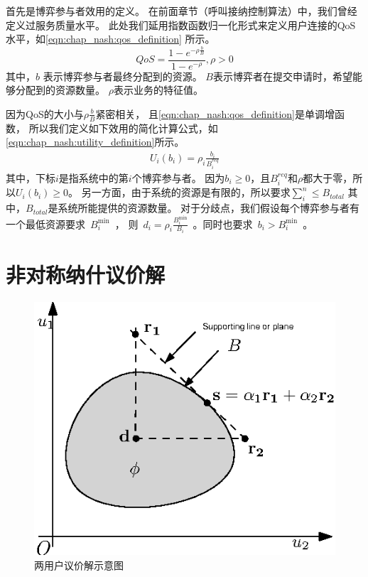 首先是博弈参与者效用的定义。
在前面章节（呼叫接纳控制算法）中，我们曾经定义过服务质量水平。
此处我们延用指数函数归一化形式来定义用户连接的QoS水平，如\eqref{eqn:chap_nash:qos_definition} 所示。
\begin{equation}
QoS = \frac{1- e^{-\rho \frac{b}{B} }}{1-e^{-\rho}}, \rho > 0
\label{eqn:chap_nash:qos_definition}
\end{equation}
其中，$b$ 表示博弈参与者最终分配到的资源。
$B$表示博弈者在提交申请时，希望能够分配到的资源数量。
$\rho$表示业务的特征值。

因为QoS的大小与$\rho \frac{b}{B}$紧密相关，
且\eqref{eqn:chap_nash:qos_definition}是单调增函数，
所以我们定义如下效用的简化计算公式，如 \eqref{eqn:chap_nash:utility_definition}所示。
\begin{align}
    U_i(b_i) = \rho_i \frac{b_i}{B_i^{req}}
    \label{eqn:chap_nash:utility_definition}
\end{align}
其中，下标$i$是指系统中的第$i$个博弈参与者。
因为$b_i\ge 0$，且$B_i^{req}$和$\rho$都大于零，所以$U_i(b_i)\ge0$。
另一方面，由于系统的资源是有限的，所以要求$\sum_i^n \le B_{total}$
其中，$B_{total}$是系统所能提供的资源数量。
对于分歧点，我们假设每个博弈参与者有一个最低资源要求~$B_i^{\min}$~，
则~$d_i = \rho_i \frac{B_i^{\min}}{B_i}$~。同时也要求~$b_i > B_i^{\min}$~。

\section{非对称纳什议价解}
\begin{figure}[!tb] 
    \centering
   \begin{minipage}[t]{0.5\linewidth} 
    \centering 
    \includegraphics[width = \textwidth]{chap_nash_2_dim_nash_bargain.eps} 
    \caption{两用户议价解示意图} 
    \label{fig:chap_bargain:2_dim_nash_bargain} 
  \end{minipage}%
\end{figure}

